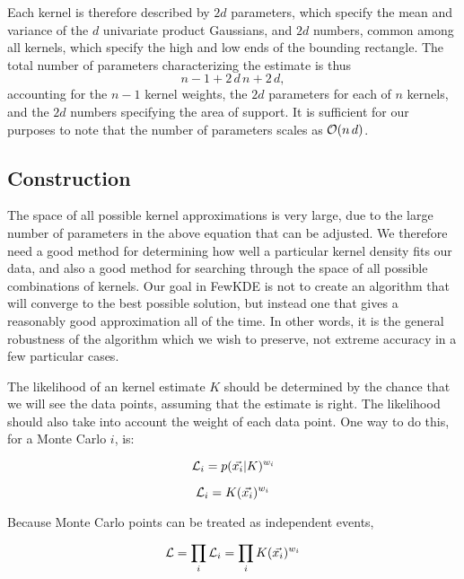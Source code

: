 \documentclass[prd,twocolumn]{revtex4}
\begin{document}
Each kernel is therefore described by $2d$ parameters, which specify the mean and variance of the $d$ univariate product Gaussians, and $2d$ numbers, common among all kernels, which specify the high and low ends of the bounding rectangle.  The total number of parameters characterizing the estimate is thus 
\begin{equation}
n-1 + 2 \, d \, n + 2 \, d,
\end{equation}
accounting for the $n-1$ kernel weights, the $2d$ parameters for each of $n$ kernels, and the $2d$ numbers specifying the area of support.  It is sufficient for our purposes to note that the number of parameters scales as ${\cal O}(n \, d)$.

\subsection{Construction}

The space of all possible kernel approximations is very large, due to the large number of parameters in the above equation that can be adjusted.  We therefore need a good method for determining how well a particular kernel density fits our data, and also a good method for searching through the space of all possible combinations of kernels.  Our goal in FewKDE is not to create an algorithm that will converge to the best possible solution, but instead one that gives a reasonably good approximation all of the time.  In other words, it is the general robustness of the algorithm which we wish to preserve, not extreme accuracy in a few particular cases.

The likelihood of an kernel estimate $K$ should be determined by the chance that we will see the data points, assuming that the estimate is right.  The likelihood should also take into account the weight of each data point.  One way to do this, for a Monte Carlo $i$, is:

\begin{equation}
\label{eqn:thingy}
{\cal L}_i = p(\vec{x_i}|K)^{w_i}
\end{equation}

\begin{equation}
\label{eqn:thingy2}
{\cal L}_i = K(\vec{x_i})^{w_i}
\end{equation}

Because Monte Carlo points can be treated as independent events,

\begin{equation}
\label{eqn:thingy2}
{\cal L} = \prod_i {\cal L}_i = \prod_i K(\vec{x_i})^{w_i}
\end{equation}
\end{document}
